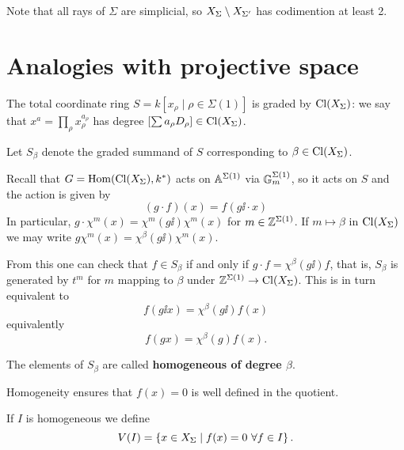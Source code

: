 \begin{remark}
Note that all rays of $\Sigma$ are simplicial, so $X_\Sigma\setminus X_{\Sigma'}$ has codimention at least 2.
\end{remark}


\section{Analogies with projective space}

The total coordinate ring $S=k[x_\rho\mid \rho\in\Sigma(1)]$ is graded by $\operatorname{Cl}(X_\Sigma)$: we say that $x^a=\prod_\rho x_\rho^{a_\rho}$ has degree $[\sum a_\rho D_\rho]\in \operatorname{Cl}(X_\Sigma)$.

Let $S_\beta$ denote the graded summand of $S$ corresponding to $\beta\in \operatorname{Cl}(X_\Sigma)$. 


Recall that $G=\operatorname{Hom}(\operatorname{Cl}(X_\Sigma),k^\ast)$ acts on $\mathbb{A}^{\Sigma(1)}$ via $\mathbb{G}_m^{\Sigma(1)}$, so it acts on $S$ and the action is given by
\[(g\cdot f)(x)=f(g\ii\cdot x)\]
In particular, $g\cdot \chi^m(x)=\chi^m(g\ii)\chi^m(x)$ for $m\in \mathbb{Z}^{\Sigma(1)}$. If $m\mapsto \beta$ in $\operatorname{Cl}(X_\Sigma)$ we may write $g\chi^m(x)=\chi^\beta(g\ii)\chi^m(x)$.

From this one can check that $f\in S_\beta$ if and only if $g\cdot f=\chi^\beta(g\ii) f$, that is, $S_\beta$ is generated by $t^m$ for $m$ mapping to $\beta$ under $\mathbb{Z}^{\Sigma(1)}\to \operatorname{Cl}(X_\Sigma)$. This is in turn equivalent to
\[f(g\ii x)=\chi^\beta(g\ii)f(x)\]
equivalently
\[f(gx)=\chi^\beta(g)f(x).\]
\begin{definition}[]
The elements of $S_\beta$ are called \textbf{homogeneous of degree $\beta$}.
\end{definition}

\begin{remark}
Homogeneity ensures that $f(x)=0$ is well defined in the quotient.
\end{remark}


\begin{definition}[]
If $I$ is homogeneous we define
\[V(I)=\left\{{x\in X_\Sigma\mid f(x)=0\ \forall f\in I}\right\}.\]
\end{definition}

